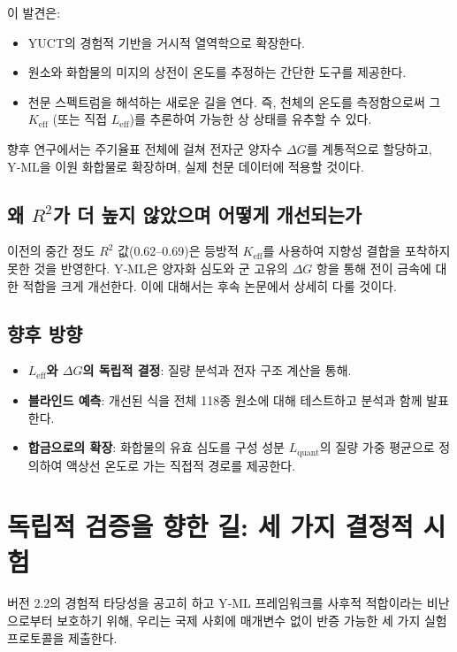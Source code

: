 \documentclass[11pt,a4paper]{article}
\newcommand{\Keff}{K_{\mathrm{eff}}}
\begin{document}
	이 발견은:
	\begin{itemize}
		\item YUCT의 경험적 기반을 거시적 열역학으로 확장한다.
		\item 원소와 화합물의 미지의 상전이 온도를 추정하는 간단한 도구를 제공한다.
		\item 천문 스펙트럼을 해석하는 새로운 길을 연다. 즉, 천체의 온도를 측정함으로써 그 \(\Keff\) (또는 직접 \(L_{\mathrm{eff}}\))를 추론하여 가능한 상 상태를 유추할 수 있다.
	\end{itemize}
	향후 연구에서는 주기율표 전체에 걸쳐 전자군 양자수 \(\Delta G\)를 계통적으로 할당하고, Y‑ML을 이원 화합물로 확장하며, 실제 천문 데이터에 적용할 것이다.
	
	\subsection{왜 \(R^2\)가 더 높지 않았으며 어떻게 개선되는가}
	이전의 중간 정도 \(R^2\) 값(0.62–0.69)은 등방적 \(K_{\mathrm{eff}}\)를 사용하여 지향성 결합을 포착하지 못한 것을 반영한다. Y‑ML은 양자화 심도와 군 고유의 \(\Delta G\) 항을 통해 전이 금속에 대한 적합을 크게 개선한다. 이에 대해서는 후속 논문에서 상세히 다룰 것이다.
	
	\subsection{향후 방향}
	\begin{itemize}
		\item \textbf{\(L_{\mathrm{eff}}\)와 \(\Delta G\)의 독립적 결정}: 질량 분석과 전자 구조 계산을 통해.
		\item \textbf{블라인드 예측}: 개선된 식을 전체 118종 원소에 대해 테스트하고 분석과 함께 발표한다.
		\item \textbf{합금으로의 확장}: 화합물의 유효 심도를 구성 성분 \(L_{\mathrm{quant}}\)의 질량 가중 평균으로 정의하여 액상선 온도로 가는 직접적 경로를 제공한다.
	\end{itemize}
	
	\section{독립적 검증을 향한 길: 세 가지 결정적 시험}
	\label{sec:decisive_tests}
	
	버전 2.2의 경험적 타당성을 공고히 하고 Y‑ML 프레임워크를 사후적 적합이라는 비난으로부터 보호하기 위해, 우리는 국제 사회에 매개변수 없이 반증 가능한 세 가지 실험 프로토콜을 제출한다.
	
\end{document}
